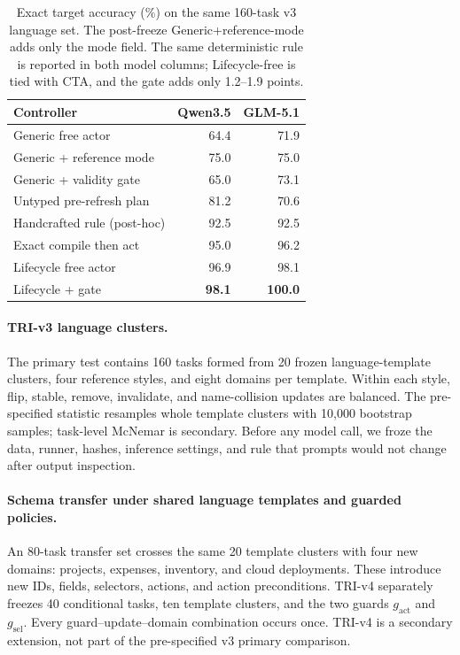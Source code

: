 \documentclass[letterpaper]{article}
\begin{document}
\begin{table}[t]
\centering
\small
\begin{tabular}{lrr}
\toprule
Controller & Qwen3.5 & GLM-5.1 \\
\midrule
Generic free actor & 64.4 & 71.9 \\
Generic + reference mode & 75.0 & 75.0 \\
Generic + validity gate & 65.0 & 73.1 \\
Untyped pre-refresh plan & 81.2 & 70.6 \\
Handcrafted rule (post-hoc) & 92.5 & 92.5 \\
Exact compile then act & 95.0 & 96.2 \\
Lifecycle free actor & 96.9 & 98.1 \\
Lifecycle + gate & \textbf{98.1} & \textbf{100.0} \\
\bottomrule
\end{tabular}
\caption{Exact target accuracy (\%) on the same 160-task v3 language set. The post-freeze
Generic+reference-mode adds only the mode field. The same deterministic rule is reported in both
model columns; Lifecycle-free is tied with CTA, and the gate adds only 1.2--1.9 points.}
\label{tab:components}
\end{table}

\paragraph{TRI-v3 language clusters.}
The primary test contains 160 tasks formed from 20 frozen language-template clusters,
four reference styles, and eight domains per template. Within each style, flip, stable, remove,
invalidate, and name-collision updates are balanced. The pre-specified statistic resamples
whole template clusters with 10,000 bootstrap samples; task-level McNemar is secondary. Before
any model call, we froze the data, runner, hashes, inference settings, and rule that prompts
would not change after output inspection.

\paragraph{Schema transfer under shared language templates and guarded policies.}
An 80-task transfer set crosses the same 20 template clusters with four new domains:
projects, expenses, inventory, and cloud deployments. These introduce new IDs, fields,
selectors, actions, and action preconditions. TRI-v4 separately freezes 40 conditional tasks,
ten template clusters, and the two guards $g_{\mathrm{act}}$ and $g_{\mathrm{sel}}$. Every
guard--update--domain combination occurs once. TRI-v4 is a secondary extension, not part of
the pre-specified v3 primary comparison.
\end{document}
